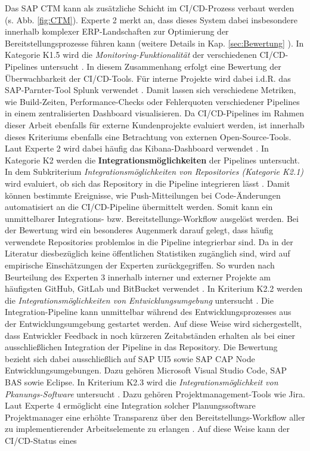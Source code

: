 Das SAP CTM kann als zusätzliche Schicht im CI/CD-Prozess verbaut werden (s. Abb. \ref{fig:CTM}). Experte 2 merkt an, dass dieses System dabei insbesondere innerhalb komplexer ERP-Landschaften zur Optimierung der Bereitstellungsprozesse führen kann (weitere Details in Kap. \ref{sec:Bewertung} )\cite[Z. 59]{ProductManagerSAPHyperspaceCICD.}. In Kategorie K1.5 wird die \textit{Monitoring-Funktionalität} der verschiedenen CI/CD-Pipelines untersucht \cite[Z. 37 ff.]{ProductManagerSAPHyperspaceCICD.}. In diesem Zusammenhang erfolgt eine Bewertung der Überwachbarkeit der CI/CD-Tools. Für interne Projekte wird dabei i.d.R. das SAP-Parnter-Tool Splunk verwendet \cite[Z. 70]{ProductManagerSAPHyperspaceCICD.}. Damit lassen sich verschiedene Metriken, wie Build-Zeiten, Performance-Checks oder Fehlerquoten verschiedener Pipelines in einem zentralisierten Dashboard visualisieren. Da CI/CD-Pipelines im Rahmen dieser Arbeit ebenfalls für externe Kundenprojekte evaluiert werden, ist innerhalb dieses Kriteriums ebenfalls eine Betrachtung von externen Open-Source-Tools. Laut Experte 2 wird dabei häufig das Kibana-Dashboard verwendet \cite[Z. 70]{ProductManagerSAPHyperspaceCICD.}. In Kategorie K2 werden die \textbf{Integrationsmöglichkeiten} der Pipelines untersucht. In dem Subkriterium \textit{Integrationsmöglichkeiten von Repositories (Kategorie K2.1)}  wird evaluiert, ob sich das Repository in die Pipeline integrieren lässt \cite[Z. 79]{ProductOwnerSAPBTPProd&Infra.}. Damit können bestimmte Ereignisse, wie Push-Mitteilungen bei Code-Änderungen automatisiert an die CI/CD-Pipeline übermittelt werden. Somit kann ein unmittelbarer Integrations- bzw. Bereitstellungs-Workflow ausgelöst werden. Bei der Bewertung wird ein besonderes Augenmerk darauf gelegt, dass häufig verwendete Repositories problemlos in die Pipeline integrierbar sind. Da in der Literatur diesbezüglich keine öffentlichen Statistiken zugänglich sind, wird auf empirische Einschätzungen der Experten zurückgegriffen. So wurden nach Beurteilung des Experten 3 innerhalb interner und externer Projekte am häufigsten GitHub, GitLab und BitBucket verwendet \cite[Z. 85]{TestDeveloperSAPHyperspaceAdoption&Onboarding.}. In Kriterium K2.2 werden die \textit{Integrationsmöglichkeiten von Entwicklungsumgebung} untersucht \cite[Z. 81 ff.]{ProductOwnerSAPBTPProd&Infra.}. Die Integration-Pipeline kann unmittelbar während des Entwicklungsprozesses aus der Entwicklungsumgebung gestartet werden. Auf diese Weise wird sichergestellt, dass Entwickler Feedback in noch kürzeren Zeitabständen erhalten als bei einer ausschließlichen Integration der Pipeline in das Repository. Die Bewertung bezieht sich dabei ausschließlich auf SAP UI5 sowie SAP CAP Node Entwicklungsumgebungen. Dazu gehören Microsoft Visual Studio Code, \ac{SAP BAS} sowie Eclipse. In Kriterium K2.3 wird die \textit{Integrationsmöglichkeit von Pkanungs-Software} untersucht \cite[Z. 89 ff.]{TestDeveloperSAPHyperspaceAdoption&Onboarding.}. Dazu gehören Projektmanagement-Tools wie Jira. Laut Experte 4 ermöglicht eine Integration solcher Planungssoftware Projektmanager eine erhöhte Transparenz über den Bereitstellungs-Workflow aller zu implementierender Arbeitselemente zu erlangen \cite[Z. 89 ff.]{TestDeveloperSAPHyperspaceAdoption&Onboarding.}. Auf diese Weise kann der CI/CD-Status eines 